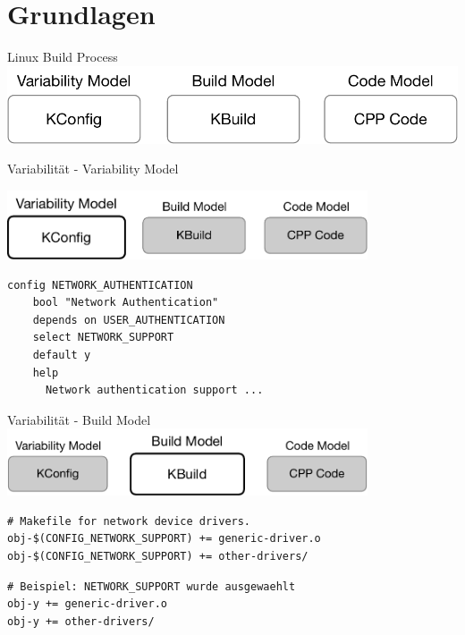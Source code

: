 \documentclass[aspectratio=43, noserifmath]{beamer}
\begin{document}
\section{Grundlagen}

\begin{frame}{Linux Build Process}
\includegraphics[width=1\textwidth]{image/linux-build-system.pdf}
\end{frame}


\begin{frame}[containsverbatim]{Variabilit\"at - Variability Model}

\includegraphics[width=0.8\textwidth]{image/linux-build-system-1.pdf}
\begin{verbatim}
config NETWORK_AUTHENTICATION
    bool "Network Authentication"
    depends on USER_AUTHENTICATION
    select NETWORK_SUPPORT
    default y
    help
      Network authentication support ...

\end{verbatim}
\end{frame}


\begin{frame}[containsverbatim]{Variabilit\"at - Build Model}
\includegraphics[width=0.8\textwidth]{image/linux-build-system-2.pdf}
\begin{verbatim}
# Makefile for network device drivers.
obj-$(CONFIG_NETWORK_SUPPORT) += generic-driver.o
obj-$(CONFIG_NETWORK_SUPPORT) += other-drivers/
\end{verbatim}

\begin{verbatim}
# Beispiel: NETWORK_SUPPORT wurde ausgewaehlt
obj-y += generic-driver.o
obj-y += other-drivers/
\end{verbatim}
\end{frame}
\end{document}

